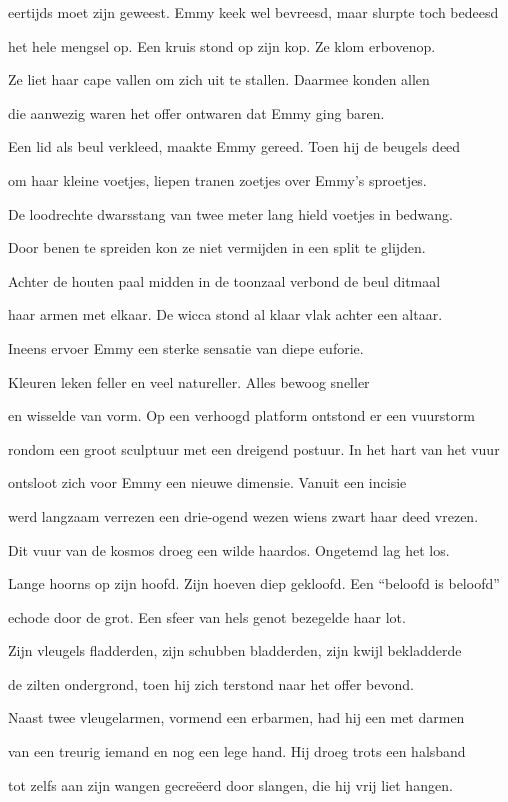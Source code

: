 eertijds moet zijn geweest.
Emmy keek wel bevreesd,
maar slurpte toch bedeesd

het hele mengsel op.
Een kruis stond op zijn kop.
Ze klom erbovenop.

Ze liet haar cape vallen
om zich uit te stallen.
Daarmee konden allen

die aanwezig waren
het offer ontwaren
dat Emmy ging baren.

Een lid als beul verkleed,
maakte Emmy gereed.
Toen hij de beugels deed

om haar kleine voetjes,
liepen tranen zoetjes
over Emmy’s sproetjes.

De loodrechte dwarsstang
van twee meter lang
hield voetjes in bedwang.

Door benen te spreiden
kon ze niet vermijden
in een split te glijden.

Achter de houten paal
midden in de toonzaal
verbond de beul ditmaal

haar armen met elkaar.
De wicca stond al klaar
vlak achter een altaar.

Ineens ervoer Emmy
een sterke sensatie
van diepe euforie.

Kleuren leken feller
en veel natureller.
Alles bewoog sneller

en wisselde van vorm.
Op een verhoogd platform
ontstond er een vuurstorm

rondom een groot sculptuur
met een dreigend postuur.
In het hart van het vuur

ontsloot zich voor Emmy
een nieuwe dimensie.
Vanuit een incisie

werd langzaam verrezen
een drie-ogend wezen
wiens zwart haar deed vrezen.

Dit vuur van de kosmos
droeg een wilde haardos.
Ongetemd lag het los.

Lange hoorns op zijn hoofd.
Zijn hoeven diep gekloofd.
Een “beloofd is beloofd”

echode door de grot.
Een sfeer van hels genot
bezegelde haar lot.

Zijn vleugels fladderden,
zijn schubben bladderden,
zijn kwijl bekladderde

de zilten ondergrond,
toen hij zich terstond
naar het offer bevond.

Naast twee vleugelarmen,
vormend een erbarmen,
had hij een met darmen

van een treurig iemand
en nog een lege hand.
Hij droeg trots een halsband

tot zelfs aan zijn wangen
gecreëerd door slangen,
die hij vrij liet hangen.

